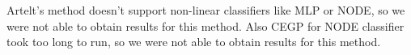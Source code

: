 Artelt’s method doesn’t support non-linear classifiers like MLP or NODE, so we were not able to obtain results for this method.
Also CEGP for NODE classifier took too long to run, so we were not able to obtain results for this method.